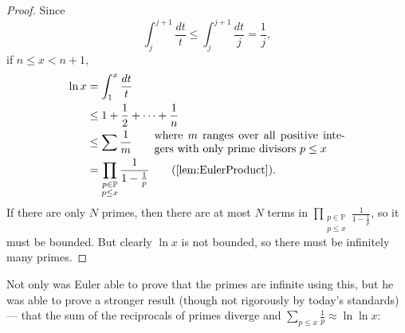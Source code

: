 \documentclass[a4paper]{article}
\theoremstyle{definition}
\theoremstyle{remark}
\begin{document}
\begin{proof}
  Since 
  \[\int_j^{j+1}\frac{dt}{t}\le\int_j^{j+1}\frac{dt}{j}=\frac{1}{j}
  ,
  \]
  if $n\le x<n+1$, 
  \begin{align*}
    \ln x&=\int_1^x\frac{dt}{t}\\
    &\le1+\frac{1}{2}+\dots+\frac{1}{n}\\
    &\le\sum\frac{1}{m}\qquad\parbox{6cm}{where $m$ ranges over all positive integers with only prime divisors $p\le x$}\\
    &=\prod\limits_{\substack{p\in\mathbb{P}\\p\le x}}\frac{1}{1-\frac{1}{p}}\qquad\text{(\cref{lem:EulerProduct})}
    .
  \end{align*}
  If there are only $N$ primes, then there are at most $N$ terms in $\displaystyle\prod\limits_{\substack{p\in\mathbb{P}\\p\le x}}\frac{1}{1-\frac{1}{p}}$, so it must be bounded. But clearly $\ln x$ is not bounded, so there must be infinitely many primes.
\end{proof}

Not only was Euler able to prove that the primes are infinite using this, but he was able to prove a stronger result (though not rigorously by today's standards) --- that the sum of the reciprocals of primes diverge and $\displaystyle\sum_{p\le x}\frac{1}{p}\approx\ln\ln x$:
\end{document}
